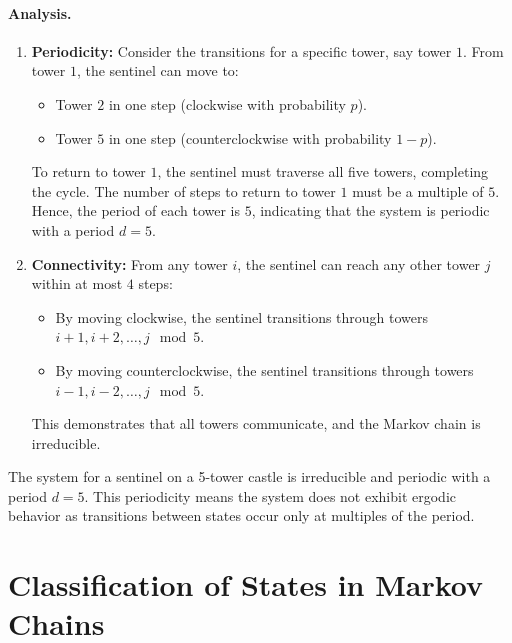 \paragraph{Analysis.}
\begin{enumerate}
    \item \textbf{Periodicity:}  
    Consider the transitions for a specific tower, say tower \( 1 \). From tower \( 1 \), the sentinel can move to:
    \begin{itemize}
        \item Tower \( 2 \) in one step (clockwise with probability \( p \)).
        \item Tower \( 5 \) in one step (counterclockwise with probability \( 1-p \)).
    \end{itemize}
    To return to tower \( 1 \), the sentinel must traverse all five towers, completing the cycle. The number of steps to return to tower \( 1 \) must be a multiple of \( 5 \). Hence, the period of each tower is \( 5 \), indicating that the system is periodic with a period \( d = 5 \).

    \item \textbf{Connectivity:}  
    From any tower \( i \), the sentinel can reach any other tower \( j \) within at most \( 4 \) steps:
    \begin{itemize}
        \item By moving clockwise, the sentinel transitions through towers \( i+1, i+2, \dots, j \mod 5 \).
        \item By moving counterclockwise, the sentinel transitions through towers \( i-1, i-2, \dots, j \mod 5 \).
    \end{itemize}
    This demonstrates that all towers communicate, and the Markov chain is irreducible.
\end{enumerate}
The system for a sentinel on a 5-tower castle is irreducible and periodic with a period \( d = 5 \). This periodicity means the system does not exhibit ergodic behavior as transitions between states occur only at multiples of the period.


\section{Classification of States in Markov Chains}

